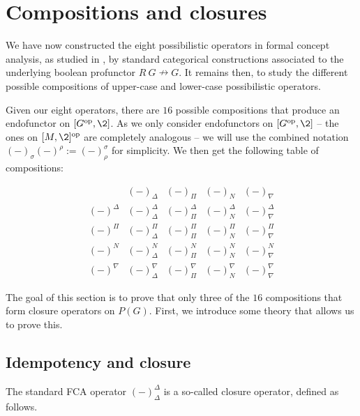 \section{Compositions and closures}

We have now constructed the eight possibilistic operators in formal concept analysis, as studied in \cite{dubois-dupin-prade_2007, dubois-prade_2009}, by standard categorical constructions associated to the underlying boolean profunctor $R\: G \nrightarrow G$. It remains then, to study the different possible compositions of upper-case and lower-case possibilistic operators. 

Given our eight operators, there are $16$ possible compositions that produce an endofunctor on $[G\op, \2]$. As we only consider endofunctors on $[G\op, \2]$ -- the ones on $[M,\2]\op$ are completely analogous -- we will use the combined notation $(-)_\sigma (-)^\rho := (-)^\sigma_\rho$ for simplicity. We then get the following table of compositions:

\begin{table}[ht]
\centering
\[
\begin{array}{c|cccc}
 & (-)_\Delta & (-)_\Pi & (-)_N & (-)_\nabla \\ \hline
(-)^\Delta
    & (-)^\Delta_\Delta
    & (-)^\Delta_\Pi
    & (-)^\Delta_N
    & (-)^\Delta_\nabla \\[0.4em]
(-)^\Pi
    & (-)^\Pi_\Delta
    & (-)^\Pi_\Pi
    & (-)^\Pi_N
    & (-)^\Pi_\nabla \\[0.4em]
(-)^N
    & (-)^N_\Delta
    & (-)^N_\Pi
    & (-)^N_N
    & (-)^N_\nabla \\[0.4em]
(-)^\nabla
    & (-)^\nabla_\Delta
    & (-)^\nabla_\Pi
    & (-)^\nabla_N
    & (-)^\nabla_\nabla
\end{array}
\]
\caption{The sixteen possible binary compositions.}
\label{tab:possibilistic-compositions}
\end{table}

The goal of this section is to prove that only three of the $16$ compositions that form closure operators on $P(G)$. First, we introduce some theory that allows us to prove this. 

\subsection{Idempotency and closure}

The standard FCA operator $(-)^\Delta_\Delta$ is a so-called closure operator, defined as follows. 

